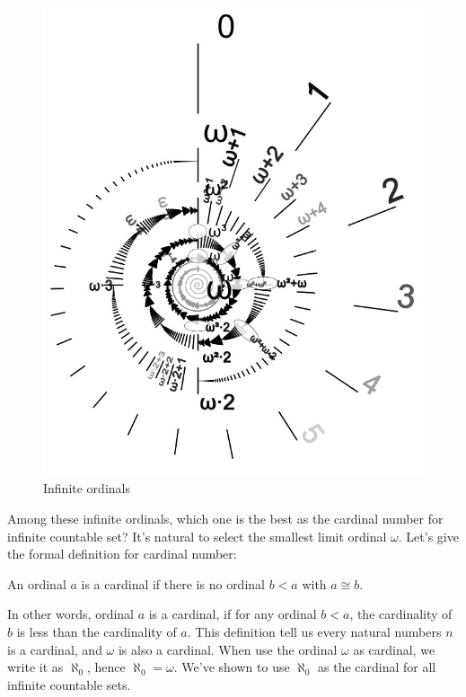 \documentclass{article}
\begin{document}
\begin{figure}[htbp]
 \centering
 \includegraphics[scale=0.3]{img/Omega-exp-omega.jpg}
 \caption{Infinite ordinals}
 \label{fig:infinite-ordinals}
\end{figure}

Among these infinite ordinals, which one is the best as the cardinal number for infinite countable set? It's natural to select the smallest limit ordinal $\omega$. Let's give the formal definition for cardinal number:

\begin{definition}
An ordinal $a$ is a cardinal if there is no ordinal $b < a$ with $ a \cong b$.
\end{definition}

In other words, ordinal $a$ is a cardinal, if for any ordinal $b < a$, the cardinality of $b$ is less than the cardinality of $a$. This definition tell us every natural numbers $n$ is a cardinal, and $\omega$ is also a cardinal. When use the ordinal $\omega$ as cardinal, we write it as $\aleph_0$, hence $\aleph_0 = \omega$. We've shown to use $\aleph_0$ as the cardinal for all infinite countable sets.
\end{document}
